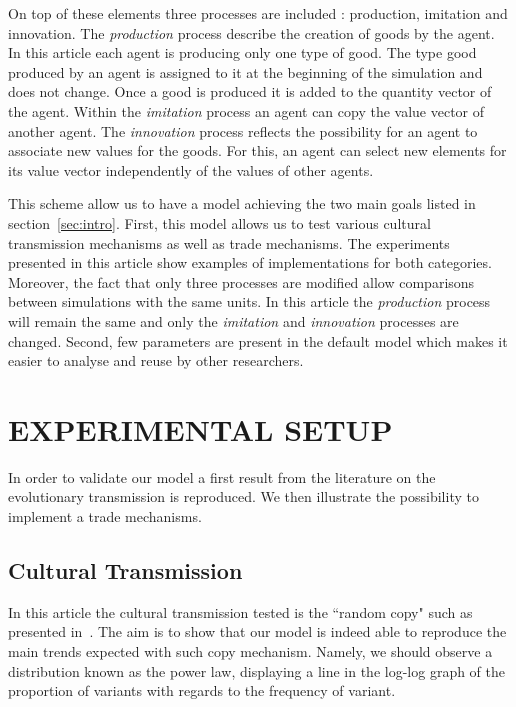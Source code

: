 \documentclass{wscpaperproc}
\begin{document}
On top of these elements three processes are included : production, imitation and innovation. The \textit{production} process describe the creation of goods by the agent. In this article each agent is producing only one type of good. The type good produced by an agent is assigned to it at the beginning of the simulation and does not change. Once a good is produced it is added to the quantity vector of the agent. Within the \textit{imitation} process an agent can copy the value vector of another agent. The \textit{innovation} process reflects the possibility for an agent to associate new values for the goods. For this, an agent can select new elements for its value vector independently of the values of other agents. 

This scheme allow us to have a model achieving the two main goals listed in section~\ref{sec:intro}. First, this model allows us to test various cultural transmission mechanisms as well as trade mechanisms. The experiments presented in this article show examples of implementations for both categories. Moreover, the fact that only three processes are modified allow comparisons between simulations with the same units. In this article the \textit{production} process will remain the same and only the \textit{imitation} and \textit{innovation} processes are changed. Second, few parameters are present in the default model which makes it easier to analyse and reuse by other researchers.


\section{EXPERIMENTAL SETUP}


In order to validate our model a first result from the literature on the evolutionary transmission is reproduced. We then illustrate the possibility to implement a trade mechanisms. 

\subsection{Cultural Transmission}

In this article the cultural transmission tested is the ``random copy" such as presented in~\cite{mesoudi_random_2009}. The aim is to show that our model is indeed able to reproduce the main trends expected with such copy mechanism. Namely, we should observe a distribution known as the power law, displaying a line in the log-log graph of the proportion of variants with regards to the frequency of variant.
\end{document}
